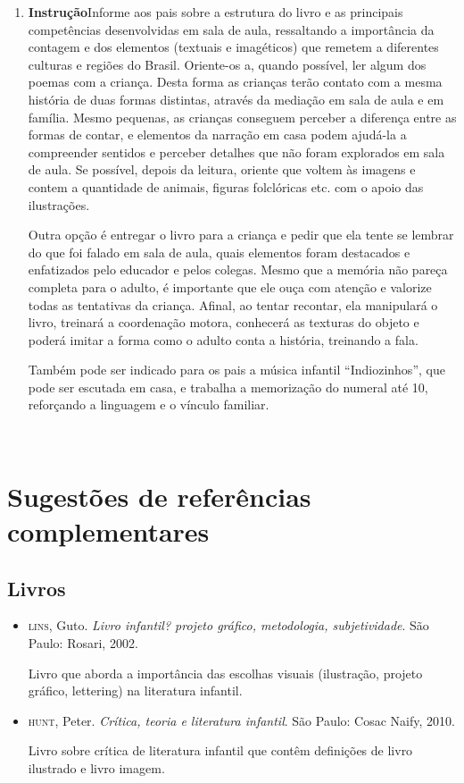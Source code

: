 \documentclass[11pt]{extarticle}
\begin{document}
\begin{enumerate}
\item \textbf{Instrução}\quad Informe aos pais sobre a estrutura do livro e as principais competências desenvolvidas em sala de aula, ressaltando a importância da contagem e dos elementos (textuais e imagéticos) que remetem a diferentes culturas e regiões do Brasil.
Oriente-os a, quando possível, ler algum dos poemas com a criança.
Desta forma as crianças terão contato com a mesma história de duas formas distintas, através da mediação em sala de aula e em família. 
Mesmo pequenas, as crianças conseguem perceber a diferença entre 
as formas de contar, e elementos da narração em casa podem ajudá-la a compreender 
sentidos e perceber detalhes que não foram explorados em sala de aula. Se possível, depois da leitura, oriente 
que voltem às imagens e contem a quantidade de animais, figuras folclóricas etc. com o apoio das  ilustrações. 

Outra opção é entregar o livro para a criança e pedir que ela tente se lembrar
do que foi falado em sala de aula, quais elementos foram destacados e enfatizados pelo educador e pelos colegas. Mesmo que a memória não pareça 
completa para o adulto, é importante que ele ouça com atenção e 
valorize todas as tentativas da criança. Afinal, ao tentar recontar, 
ela manipulará o livro, treinará a coordenação motora, conhecerá as texturas 
do objeto e poderá imitar a forma como o adulto 
conta a história, treinando a fala. 

Também pode ser indicado para os pais a música infantil ``Indiozinhos'', que pode ser escutada em casa, e trabalha a memorização do numeral até 10, reforçando a linguagem e o vínculo familiar. 
\end{enumerate}

 
\section{Sugestões de referências complementares}

\subsection{Livros} 

\begin{itemize}
\item \textsc{lins}, Guto. \textit{Livro infantil? projeto gráfico, metodologia, subjetividade}. São Paulo: Rosari, 2002.

Livro que aborda a importância das escolhas visuais (ilustração, projeto gráfico, lettering) na literatura infantil.  

\item \textsc{hunt}, Peter. \textit{Crítica, teoria e literatura infantil}. São Paulo: Cosac Naify, 2010.

Livro sobre crítica de literatura infantil que contêm definições de livro ilustrado e livro imagem. 
\end{itemize}
\end{document}

